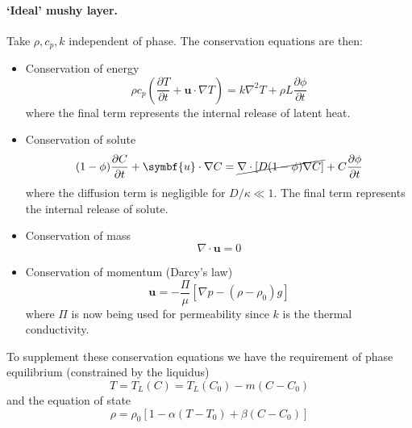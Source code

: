 \documentclass{jknotes}
\renewcommand{\u}{\symbf{u}}
\begin{document}
\paragraph{`Ideal' mushy layer.} Take $\rho, c_p, k$ independent of phase. The
conservation equations are then:
\begin{itemize}
	\item Conservation of energy
		\begin{equation}
			\rho c_p \left( \frac{\partial T}{\partial t} + \u \cdot \nabla
			T\right) = k \nabla^2 T + \rho L \frac{\partial \phi}{\partial t}
			\label{eq:l11:1}
		\end{equation}
		where the final term represents the internal release of latent heat.
	\item Conservation of solute
		\begin{equation}
			(1-\phi)\frac{\partial C}{\partial t} + \u \cdot \nabla C =
			\cancel{\nabla \cdot \left[ D(1-\phi) \nabla C\right]} + C \frac{\partial
			\phi}{\partial t}\label{eq:l11:2}
		\end{equation}
		where the diffusion term is negligible for $D/\kappa \ll 1$. The final
		term represents the internal release of solute.
	\item Conservation of mass
		\begin{equation}
			\nabla \cdot \u = 0 \label{eq:l11:3}
		\end{equation}
	\item Conservation of momentum (Darcy's law)
		\begin{equation}
			\u = -\frac{\Pi}{\mu} \left[ \nabla p - (\rho -
			\rho_0)g\right]\label{eq:l11:4}
		\end{equation}
		where $\Pi$ is now being used for permeability since $k$ is the
		thermal conductivity.
\end{itemize}
To supplement these conservation equations we have the requirement of phase
equilibrium (constrained by the liquidus)
\begin{equation}
	T = T_L(C) = T_L(C_0) - m(C-C_0)\label{eq:l11:5}
\end{equation}
and the equation of state
\begin{equation}
	\rho = \rho_0 \left[ 1 - \alpha(T-T_0) + \beta
	(C-C_0)\right]\label{eq:l11:6}
\end{equation}
\end{document}
